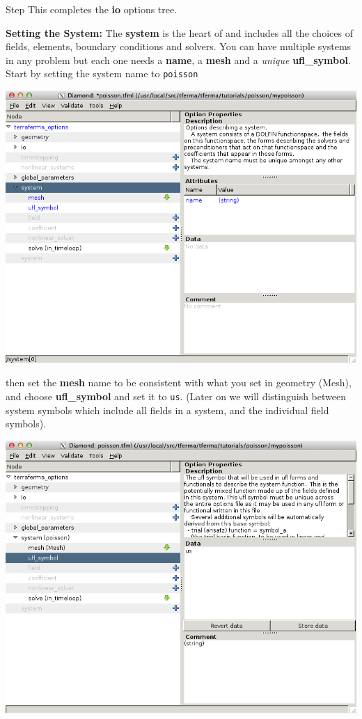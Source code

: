\begin{steps}{Step}
This completes the \textbf{io} options tree.
\item \textbf{Setting the System:}  The \textbf{system} is the heart of
  \TF{} and includes all the choices of fields, elements, boundary
  conditions and solvers.  You can have multiple systems in any
  problem but each one needs a \textbf{name}, a \textbf{mesh} and a
  \emph{unique} \textbf{ufl\_symbol}.  Start by setting the system name to \texttt{poisson} 
\begin{center}
    \includegraphics[width=\diamondwidth]{figures/screendumps/diamond_poisson_05a.png}
\end{center}
then set the \textbf{mesh} name to be consistent with what you set in
geometry (Mesh), and choose \textbf{ufl\_symbol} and set it to
\texttt{us}. (Later on we will distinguish between system symbols
which include all fields in a system, and the individual field
symbols).
\begin{center}
    \includegraphics[width=\diamondwidth]{figures/screendumps/diamond_poisson_05c.png}

\end{center}
\end{steps}
